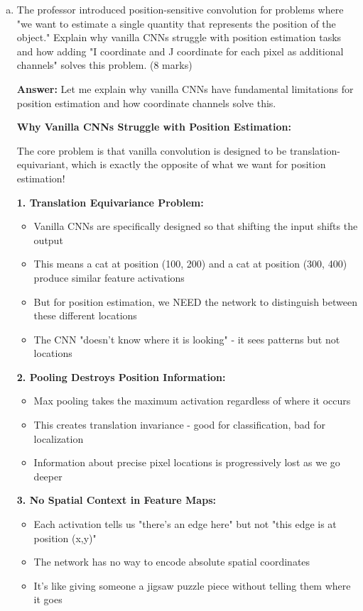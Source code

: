 \documentclass[12pt]{article}
\newcommand{\answer}[1]{{\color{answercolor}\textbf{Answer:} #1}}
\newcommand{\explanation}[1]{{\color{explanationcolor}#1}}
\begin{document}
\begin{enumerate}[(a)]
    \item The professor introduced position-sensitive convolution for problems where "we want to estimate a single quantity that represents the position of the object." Explain why vanilla CNNs struggle with position estimation tasks and how adding "I coordinate and J coordinate for each pixel as additional channels" solves this problem. \hfill (8 marks)
    
    \answer{
    Let me explain why vanilla CNNs have fundamental limitations for position estimation and how coordinate channels solve this.
    
    \textbf{Why Vanilla CNNs Struggle with Position Estimation:}
    
    \explanation{
    The core problem is that vanilla convolution is designed to be translation-equivariant, which is exactly the opposite of what we want for position estimation!
    
    \textbf{1. Translation Equivariance Problem:}
    \begin{itemize}
        \item Vanilla CNNs are specifically designed so that shifting the input shifts the output
        \item This means a cat at position (100, 200) and a cat at position (300, 400) produce similar feature activations
        \item But for position estimation, we NEED the network to distinguish between these different locations
        \item The CNN "doesn't know where it is looking" - it sees patterns but not locations
    \end{itemize}
    
    \textbf{2. Pooling Destroys Position Information:}
    \begin{itemize}
        \item Max pooling takes the maximum activation regardless of where it occurs
        \item This creates translation invariance - good for classification, bad for localization
        \item Information about precise pixel locations is progressively lost as we go deeper
    \end{itemize}
    
    \textbf{3. No Spatial Context in Feature Maps:}
    \begin{itemize}
        \item Each activation tells us "there's an edge here" but not "this edge is at position (x,y)"
        \item The network has no way to encode absolute spatial coordinates
        \item It's like giving someone a jigsaw puzzle piece without telling them where it goes
    \end{itemize}
    }
    
}
\end{enumerate}
\end{document}
